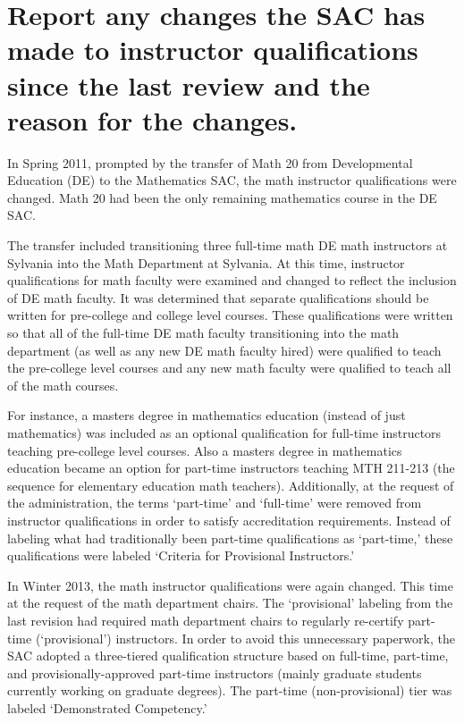 \section{Report any changes the SAC has made to instructor qualifications since the last review and the reason for the changes.}
In Spring 2011, prompted by the transfer of Math 20 from Developmental Education (DE) to the Mathematics SAC, the math instructor qualifications were changed.  Math 20 had been the only remaining mathematics course in the DE SAC.  

The transfer included transitioning three full-time math DE math instructors at Sylvania into the Math Department at Sylvania.  At this time, instructor qualifications for math faculty were examined and changed to reflect the inclusion of DE math faculty.  It was determined that separate qualifications should be written for pre-college and college level courses.  These qualifications were written so that all of the full-time DE math faculty transitioning into the math department (as well as any new DE math faculty hired) were qualified to teach the pre-college level courses and any new math faculty were qualified to teach all of the math courses.  

For instance, a masters degree in mathematics education (instead of just mathematics) was included as an optional qualification for full-time instructors teaching pre-college level courses.  Also a masters degree in mathematics education became an option for part-time instructors teaching MTH 211-213 (the sequence for elementary education math teachers).  Additionally, at the request of the administration, the terms `part-time' and `full-time' were removed from instructor qualifications in order to satisfy accreditation requirements.  Instead of labeling what had traditionally been part-time qualifications as `part-time,' these qualifications were labeled `Criteria for Provisional Instructors.'

In Winter 2013, the math instructor qualifications were again changed.  This time at the request of the math department chairs.  The `provisional' labeling from the last revision had required math department chairs to regularly re-certify part-time (`provisional') instructors.  In order to avoid this unnecessary paperwork, the SAC adopted a three-tiered qualification structure based on full-time, part-time, and provisionally-approved part-time instructors (mainly graduate students currently working on graduate degrees).  The part-time (non-provisional) tier was labeled `Demonstrated Competency.'

